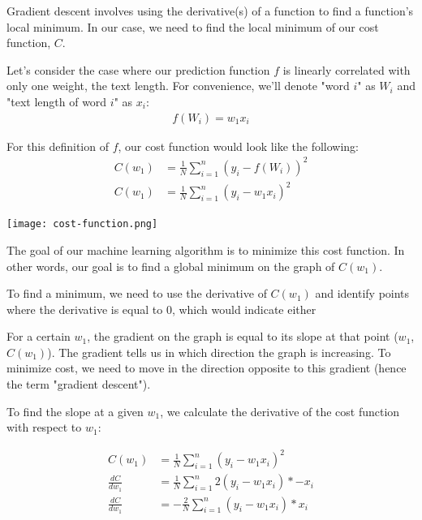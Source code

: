 \documentclass[12pt, demo]{article}
\begin{document}
Gradient descent involves using the derivative(s) of a function to find a function's local minimum. In our case, we need to find the local minimum of our cost function, $C$.

Let's consider the case where our prediction function $f$ is linearly correlated with only one weight, the text length. For convenience, we'll denote "word $i$" as $W_i$ and "text length of word $i$" as $x_i$:
\begin{align}
	f(W_i) = w_1x_i
\end{align}

For this definition of $f$, our cost function would look like the following:
\begin{align}
	C(w_1) & = \frac{1}{N} \sum_{i=1}^{n} (y_i - f(W_i))^2
	\\
	C(w_1) & = \frac{1}{N} \sum_{i=1}^{n} (y_i - w_1x_i)^2
\end{align}

\texttt{[image: cost-function.png]}

The goal of our machine learning algorithm is to minimize this cost function. In other words, our goal is to find a global minimum on the graph of $C(w_1)$.

To find a minimum, we need to use the derivative of $C(w_1)$ and identify points where the derivative is equal to 0, which would indicate either

For a certain $w_1$, the gradient on the graph is equal to its slope at that point ($w_1$, $C(w_1)$). The gradient tells us in which direction the graph is increasing. To minimize cost, we need to move in the direction opposite to this gradient (hence the term "gradient descent").

To find the slope at a given $w_1$, we calculate the derivative of the cost function with respect to $w_1$:

\begin{align*}
	C(w_1)          & = \frac{1}{N} \sum_{i=1}^{n} (y_i - w_1x_i)^2
	\\
	\frac{dC}{dw_1} & = \frac{1}{N} \sum_{i=1}^{n} 2(y_i - w_1x_i) * -x_i
	\\
	\frac{dC}{dw_1} & = -\frac{2}{N} \sum_{i=1}^{n} (y_i - w_1x_i) * x_i
\end{align*}
\end{document}
